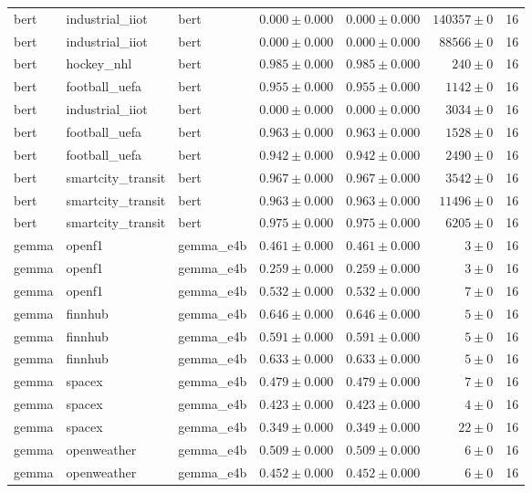 \begin{table}[htbp]
\begin{tabular}{l l l r r r r}
bert & industrial\_iiot & bert & $0.000\pm0.000$ & $0.000\pm0.000$ & $140357\pm0$ & 16 \\
bert & industrial\_iiot & bert & $0.000\pm0.000$ & $0.000\pm0.000$ & $88566\pm0$ & 16 \\
bert & hockey\_nhl & bert & $0.985\pm0.000$ & $0.985\pm0.000$ & $240\pm0$ & 16 \\
bert & football\_uefa & bert & $0.955\pm0.000$ & $0.955\pm0.000$ & $1142\pm0$ & 16 \\
bert & industrial\_iiot & bert & $0.000\pm0.000$ & $0.000\pm0.000$ & $3034\pm0$ & 16 \\
bert & football\_uefa & bert & $0.963\pm0.000$ & $0.963\pm0.000$ & $1528\pm0$ & 16 \\
bert & football\_uefa & bert & $0.942\pm0.000$ & $0.942\pm0.000$ & $2490\pm0$ & 16 \\
bert & smartcity\_transit & bert & $0.967\pm0.000$ & $0.967\pm0.000$ & $3542\pm0$ & 16 \\
bert & smartcity\_transit & bert & $0.963\pm0.000$ & $0.963\pm0.000$ & $11496\pm0$ & 16 \\
bert & smartcity\_transit & bert & $0.975\pm0.000$ & $0.975\pm0.000$ & $6205\pm0$ & 16 \\
gemma & openf1 & gemma\_e4b & $0.461\pm0.000$ & $0.461\pm0.000$ & $3\pm0$ & 16 \\
gemma & openf1 & gemma\_e4b & $0.259\pm0.000$ & $0.259\pm0.000$ & $3\pm0$ & 16 \\
gemma & openf1 & gemma\_e4b & $0.532\pm0.000$ & $0.532\pm0.000$ & $7\pm0$ & 16 \\
gemma & finnhub & gemma\_e4b & $0.646\pm0.000$ & $0.646\pm0.000$ & $5\pm0$ & 16 \\
gemma & finnhub & gemma\_e4b & $0.591\pm0.000$ & $0.591\pm0.000$ & $5\pm0$ & 16 \\
gemma & finnhub & gemma\_e4b & $0.633\pm0.000$ & $0.633\pm0.000$ & $5\pm0$ & 16 \\
gemma & spacex & gemma\_e4b & $0.479\pm0.000$ & $0.479\pm0.000$ & $7\pm0$ & 16 \\
gemma & spacex & gemma\_e4b & $0.423\pm0.000$ & $0.423\pm0.000$ & $4\pm0$ & 16 \\
gemma & spacex & gemma\_e4b & $0.349\pm0.000$ & $0.349\pm0.000$ & $22\pm0$ & 16 \\
gemma & openweather & gemma\_e4b & $0.509\pm0.000$ & $0.509\pm0.000$ & $6\pm0$ & 16 \\
gemma & openweather & gemma\_e4b & $0.452\pm0.000$ & $0.452\pm0.000$ & $6\pm0$ & 16 \\

\end{tabular}
\end{table}
